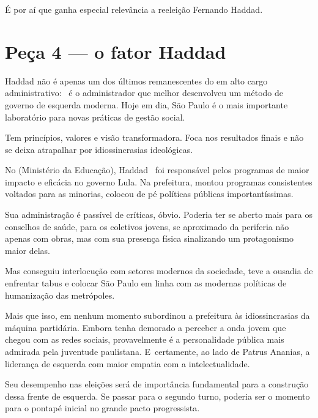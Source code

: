 É por aí que ganha especial relevância a reeleição Fernando Haddad.

\section{Peça 4 --- o fator Haddad}

Haddad não é apenas um dos últimos remanescentes do  em alto cargo
administrativo:~ é o administrador que melhor desenvolveu um método de
governo de esquerda moderna. Hoje em dia, São Paulo é o mais importante
laboratório para novas práticas de gestão social.

Tem princípios, valores e visão transformadora. Foca nos resultados
finais e não se deixa atrapalhar por idiossincrasias ideológicas.

No  (Ministério da Educação), Haddad~ foi responsável pelos programas
de maior impacto e eficácia no governo Lula. Na prefeitura, montou
programas consistentes voltados para as minorias, colocou de pé
políticas públicas importantíssimas.

Sua administração é passível de críticas, óbvio. Poderia ter se aberto
mais para os conselhos de saúde, para os coletivos jovens, se aproximado
da periferia não apenas com obras, mas com sua presença física
sinalizando um protagonismo maior delas.

Mas conseguiu interlocução com setores modernos da sociedade, teve a
ousadia de enfrentar tabus e colocar São Paulo em linha com as modernas
políticas de humanização das metrópoles.

Mais que isso, em nenhum momento subordinou a prefeitura às
idiossincrasias da máquina partidária. Embora tenha demorado a perceber
a onda jovem que chegou com as redes sociais, provavelmente é a
personalidade pública mais admirada pela juventude paulistana. E~certamente, ao lado de Patrus Ananias, a liderança de esquerda com maior
empatia com a intelectualidade.

Seu desempenho nas eleições será de importância fundamental para a
construção dessa frente de esquerda. Se passar para o segundo turno,
poderia ser o momento para o pontapé inicial no grande pacto
progressista.
